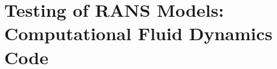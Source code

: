 \documentclass[11pt]{article}
\begin{document}
\subsection{}

\subsection{}

\section{Testing of RANS Models: Computational Fluid Dynamics Code}

\subsection{}

\end{document}
